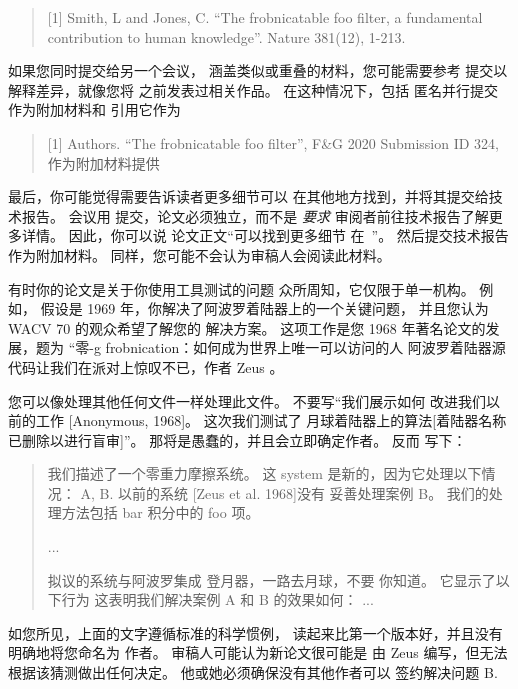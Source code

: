 \documentclass[10pt,letterpaper,a4paper]{article}
\begin{document}
\begin{sloppypar}
\begin{quote}
    [1] Smith, L and Jones, C. ``The frobnicatable foo
    filter, a fundamental contribution to human knowledge''.
    Nature 381(12), 1-213.
\end{quote}

如果您同时提交给另一个会议，
涵盖类似或重叠的材料，您可能需要参考
提交以解释差异，就像您将
之前发表过相关作品。 在这种情况下，包括
匿名并行提交~\cite{Authors20} 作为附加材料和
引用它作为
\begin{quote}
[1] Authors. ``The frobnicatable foo filter'', F\&G 2020 Submission ID 324,
作为附加材料提供
\end{quote}

最后，你可能觉得需要告诉读者更多细节可以
在其他地方找到，并将其提交给技术报告。 会议用
提交，论文必须独立，而不是 {\em 要求}
审阅者前往技术报告了解更多详情。 因此，你可以说
论文正文``可以找到更多细节
在~\cite{Authors20b}''。 然后提交技术报告作为附加材料。
同样，您可能不会认为审稿人会阅读此材料。

有时你的论文是关于你使用工具测试的问题
众所周知，它仅限于单一机构。 例如，
假设是 1969 年，你解决了阿波罗着陆器上的一个关键问题，
并且您认为 WACV 70 的观众希望了解您的
解决方案。 这项工作是您 1968 年著名论文的发展，题为
``零-g frobnication：如何成为世界上唯一可以访问的人
阿波罗着陆器源代码让我们在派对上惊叹不已，作者 Zeus \etal。

您可以像处理其他任何文件一样处理此文件。 不要写“我们展示如何
改进我们以前的工作 [Anonymous, 1968]。 这次我们测试了
月球着陆器上的算法[着陆器名称已删除以进行盲审]''。
那将是愚蠢的，并且会立即确定作者。 反而
写下：
\begin{quotation}
\noindent
我们描述了一个零重力摩擦系统。 这
    system 是新的，因为它处理以下情况：
    A, B. 以前的系统 [Zeus et al. 1968]没有
    妥善处理案例 B。 我们的处理方法包括
    bar 积分中的 foo 项。

    ...

    拟议的系统与阿波罗集成
    登月器，一路去月球，不要
    你知道。 它显示了以下行为
    这表明我们解决案例 A 和 B 的效果如何： ...
\end{quotation}
如您所见，上面的文字遵循标准的科学惯例，
读起来比第一个版本好，并且没有明确地将您命名为
作者。 审稿人可能认为新论文很可能是
由 Zeus \etal 编写，但无法根据该猜测做出任何决定。
他或她必须确保没有其他作者可以
签约解决问题 B.
\medskip


\end{sloppypar}
\end{document}
